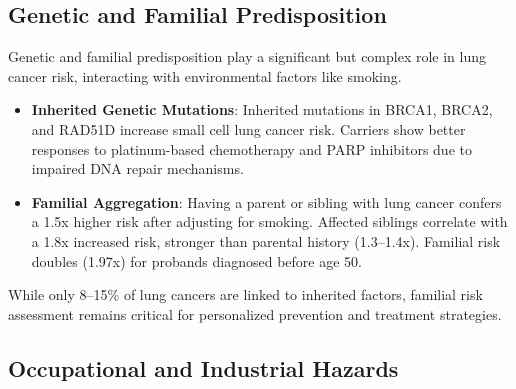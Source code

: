 
\subsection{Genetic and Familial Predisposition}

Genetic and familial predisposition play a significant but complex role in lung cancer risk, 
interacting with environmental factors like smoking.

\begin{itemize}
    \item \textbf{Inherited Genetic Mutations}: Inherited mutations in BRCA1, BRCA2, and RAD51D 
    increase small cell lung cancer risk. Carriers show better responses to platinum-based 
    chemotherapy and PARP inhibitors due to impaired DNA repair mechanisms. 

    \item \textbf{Familial Aggregation}: Having a parent or sibling with lung cancer confers a 1.5x 
    higher risk after adjusting for smoking. Affected siblings correlate with a 1.8x increased risk, 
    stronger than parental history (1.3–1.4x). Familial risk doubles (1.97x) for probands diagnosed 
    before age 50.\cite{eur2012}
\end{itemize}

While only 8–15\% of lung cancers\cite{ol2017} are linked to inherited factors, familial risk 
assessment remains critical for personalized prevention and treatment strategies.


\subsection{Occupational and Industrial Hazards}

